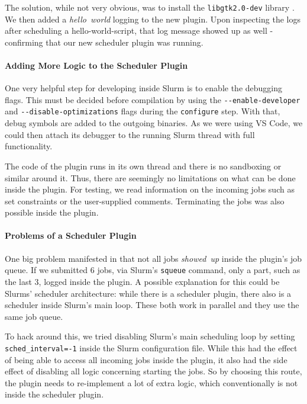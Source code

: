 The solution, while not very obvious, was to install the \verb|libgtk2.0-dev| library .
We then added a \emph{hello~world} logging to the new plugin. Upon inspecting the logs after scheduling a hello-world-script, that log message showed up as well - confirming that our new scheduler plugin was running.

\paragraph{Adding More Logic to the Scheduler Plugin}

One very helpful step for developing inside Slurm is to enable the debugging flags.
This must be decided before compilation by using the \verb|--enable-developer| and \verb|--disable-optimizations| flags during the \verb|configure| step. 
With that, debug symbols are added to the outgoing binaries. 
As we were using VS Code, we could then attach its debugger to the running Slurm thread with full functionality.

The code of the plugin runs in its own thread and there is no sandboxing or similar around it.
Thus, there are seemingly no limitations on what can be done inside the plugin. 
For testing, we read information on the incoming jobs such as set constraints or the user-supplied comments. Terminating the jobs was also possible inside the plugin.

\paragraph{Problems of a Scheduler Plugin}

One big problem manifested in that not all jobs \emph{showed~up} inside the plugin's job queue. 
If we submitted 6 jobs, via Slurm's \verb|squeue| command, only a part, such as the last 3, logged inside the plugin.
A possible explanation for this could be Slurms' scheduler architecture: while there is a scheduler plugin, there also is a scheduler inside Slurm's main loop. These both work in parallel  and they use the same job queue.

To hack around this, we tried disabling Slurm's main scheduling loop by setting \verb|sched_interval=-1| inside the Slurm configuration file. 
While this had the effect of being able to access all incoming jobs inside the plugin, it also had the side effect of disabling all logic concerning starting the jobs.
So by choosing this route, the plugin needs to re-implement a lot of extra logic, which conventionally is not inside the scheduler plugin. 

